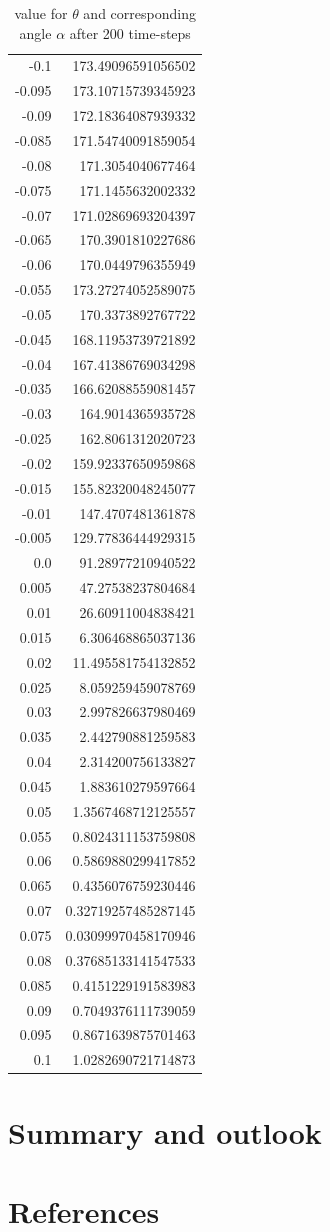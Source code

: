 \documentclass{mimosis}
\begin{document}
\begin{longtable}{rr}
\caption{\label{angle-table}value for \(\theta\) and corresponding angle \(\alpha\) after 200 time-steps}
\\
-0.1 & 173.49096591056502\\
-0.095 & 173.10715739345923\\
-0.09 & 172.18364087939332\\
-0.085 & 171.54740091859054\\
-0.08 & 171.3054040677464\\
-0.075 & 171.1455632002332\\
-0.07 & 171.02869693204397\\
-0.065 & 170.3901810227686\\
-0.06 & 170.0449796355949\\
-0.055 & 173.27274052589075\\
-0.05 & 170.3373892767722\\
-0.045 & 168.11953739721892\\
-0.04 & 167.41386769034298\\
-0.035 & 166.62088559081457\\
-0.03 & 164.9014365935728\\
-0.025 & 162.8061312020723\\
-0.02 & 159.92337650959868\\
-0.015 & 155.82320048245077\\
-0.01 & 147.4707481361878\\
-0.005 & 129.77836444929315\\
0.0 & 91.28977210940522\\
0.005 & 47.27538237804684\\
0.01 & 26.60911004838421\\
0.015 & 6.306468865037136\\
0.02 & 11.495581754132852\\
0.025 & 8.059259459078769\\
0.03 & 2.997826637980469\\
0.035 & 2.442790881259583\\
0.04 & 2.314200756133827\\
0.045 & 1.883610279597664\\
0.05 & 1.3567468712125557\\
0.055 & 0.8024311153759808\\
0.06 & 0.5869880299417852\\
0.065 & 0.4356076759230446\\
0.07 & 0.32719257485287145\\
0.075 & 0.03099970458170946\\
0.08 & 0.37685133141547533\\
0.085 & 0.4151229191583983\\
0.09 & 0.7049376111739059\\
0.095 & 0.8671639875701463\\
0.1 & 1.0282690721714873\\
\end{longtable}
\chapter{Summary and outlook}
\label{sec:org47750d2}

\chapter{References}
\label{sec:org67bd0e9}
\printbibliography
\end{document}
